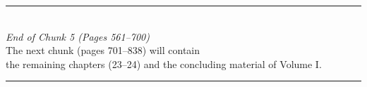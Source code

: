 \documentclass[11pt,a4paper]{article}
\begin{document}
\vspace{1cm}

\begin{center}
\rule{0.4\textwidth}{0.4pt}\\[0.5cm]
{\large\textit{End of Chunk 5 (Pages 561–700)}}\\[0.3cm]
{\small The next chunk (pages 701–838) will contain\\
the remaining chapters (23–24) and the concluding material of Volume I.}\\[0.5cm]
\rule{0.4\textwidth}{0.4pt}
\end{center}
\end{document}
